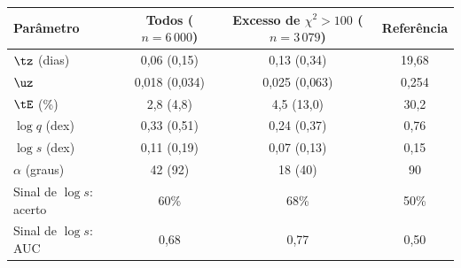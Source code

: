 \begin{tabular}{lccc}
	\toprule
	Parâmetro & Todos ($n = 6\,000$) & Excesso de $\chi^2 > 100$ ($n = 3\,079$) & Referência \\
	\midrule
	$\tz$ (dias) & 0{,}06 (0{,}15) & 0{,}13 (0{,}34) & 19{,}68 \\
	$\uz$ & 0{,}018 (0{,}034) & 0{,}025 (0{,}063) & 0{,}254 \\
	$\tE$ (\%) & 2{,}8 (4{,}8) & 4{,}5 (13{,}0) & 30{,}2 \\
	$\log q$ (dex) & 0{,}33 (0{,}51) & 0{,}24 (0{,}37) & 0{,}76 \\
	$\log s$ (dex) & 0{,}11 (0{,}19) & 0{,}07 (0{,}13) & 0{,}15 \\
	$\alpha$ (graus) & 42 (92) & 18 (40) & 90 \\
	Sinal de $\log s$: acerto & 60\% & 68\% & 50\% \\
	Sinal de $\log s$: AUC & 0{,}68 & 0{,}77 & 0,50 \\
	\bottomrule
\end{tabular}
